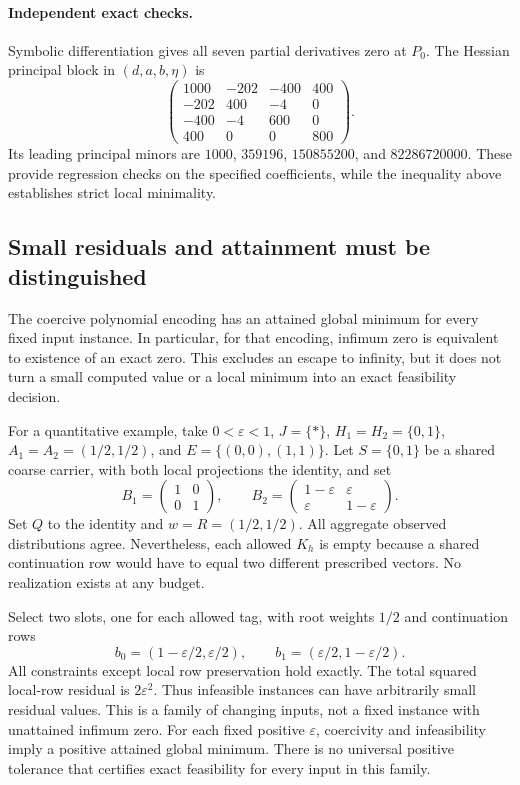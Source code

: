 \paragraph{Independent exact checks.}
Symbolic differentiation gives all seven partial derivatives zero at
$P_0$.  The Hessian principal block in $(d,a,b,\eta)$ is
\[
 \begin{pmatrix}
 1000&-202&-400&400\\
 -202&400&-4&0\\
 -400&-4&600&0\\
 400&0&0&800
 \end{pmatrix}.
\]
Its leading principal minors are
$1000$, $359196$, $150855200$, and $82286720000$.
These provide regression checks on the specified coefficients, while the
inequality above establishes strict local minimality.

\subsection{Small residuals and attainment must be distinguished}

The coercive polynomial encoding has an attained global minimum for every
fixed input instance.  In particular, for that encoding, infimum zero is
equivalent to existence of an exact zero.  This excludes an escape to
infinity, but it does not turn a small computed value or a local minimum
into an exact feasibility decision.

For a quantitative example, take $0<\varepsilon<1$,
$J=\{*\}$, $H_1=H_2=\{0,1\}$,
$A_1=A_2=(1/2,1/2)$, and
$E=\{(0,0),(1,1)\}$.  Let $S=\{0,1\}$ be a shared coarse
carrier, with both local projections the identity, and set
\[
 B_1=\begin{pmatrix}1&0\\0&1\end{pmatrix},\qquad
 B_2=\begin{pmatrix}1-\varepsilon&\varepsilon\\
                   \varepsilon&1-\varepsilon\end{pmatrix}.
\]
Set $Q$ to the identity and $w=R=(1/2,1/2)$.
All aggregate observed distributions agree.  Nevertheless, each allowed
$K_h$ is empty because a shared continuation row would have to equal two
different prescribed vectors.  No realization exists at any budget.

Select two slots, one for each allowed tag, with root weights $1/2$ and
continuation rows
\[
 b_0=(1-\varepsilon/2,\varepsilon/2),\qquad
 b_1=(\varepsilon/2,1-\varepsilon/2).
\]
All constraints except local row preservation hold exactly.  The total
squared local-row residual is $2\varepsilon^2$.  Thus infeasible instances
can have arbitrarily small residual values.  This is a family of changing
inputs, not a fixed instance with unattained infimum zero.  For each fixed
positive $\varepsilon$, coercivity and infeasibility imply a positive
attained global minimum.  There is no universal positive tolerance that
certifies exact feasibility for every input in this family.

